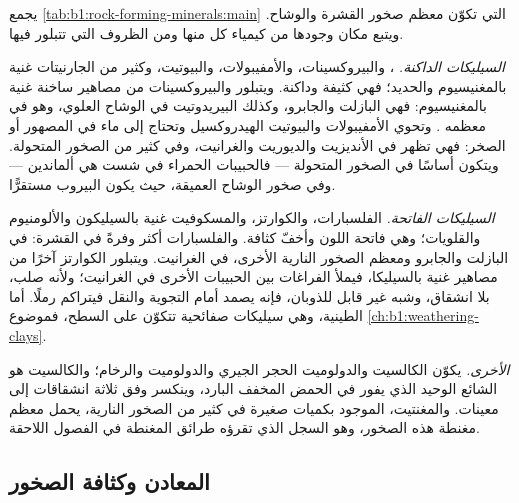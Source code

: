 يجمع \cref{tab:b1:rock-forming-minerals:main}  التي تكوّن معظم صخور القشرة والوشاح. ويتبع مكان وجودها من كيمياء كل منها ومن الظروف التي تتبلور فيها.

\emph{السيليكات الداكنة.} ، والبيروكسينات، والأمفيبولات، والبيوتيت، وكثير من الجارنيتات غنية بالمغنيسيوم والحديد؛ فهي كثيفة وداكنة. ويتبلور  والبيروكسينات من مصاهير ساخنة غنية بالمغنيسيوم: فهي  البازلت والجابرو، وكذلك البيريدوتيت في الوشاح العلوي، وهو في معظمه . وتحوي الأمفيبولات والبيوتيت الهيدروكسيل وتحتاج إلى ماء في المصهور أو الصخر: فهي تظهر في الأنديزيت والديوريت والغرانيت، وفي كثير من الصخور المتحولة. ويتكون  أساسًا في الصخور المتحولة --- فالحبيبات الحمراء في شست  هي ألماندين --- وفي صخور الوشاح العميقة، حيث يكون البيروب مستقرًّا.

\emph{السيليكات الفاتحة.} الفلسبارات، والكوارتز، والمسكوفيت غنية بالسيليكون والألومنيوم والقلويات؛ وهي فاتحة اللون وأخفّ كثافة. والفلسبارات أكثر  وفرةً في القشرة:  في البازلت والجابرو ومعظم الصخور النارية الأخرى،  في الغرانيت. ويتبلور الكوارتز آخرًا من مصاهير غنية بالسيليكا، فيملأ الفراغات بين الحبيبات الأخرى في الغرانيت؛ ولأنه صلب، بلا انشقاق، وشبه غير قابل للذوبان، فإنه يصمد أمام التجوية والنقل فيتراكم رملًا. أما  الطينية، وهي سيليكات صفائحية تتكوّن على السطح، فموضوع \cref{ch:b1:weathering-clays}.

\emph{الأخرى.} يكوّن الكالسيت والدولوميت الحجر الجيري والدولوميت والرخام؛ والكالسيت هو  الشائع الوحيد الذي يفور في الحمض المخفف البارد، وينكسر وفق ثلاثة انشقاقات إلى معينات. والمغنتيت، الموجود بكميات صغيرة في كثير من الصخور النارية، يحمل معظم مغنطة هذه الصخور، وهو السجل الذي تقرؤه طرائق المغنطة في الفصول اللاحقة.


\subsection{المعادن وكثافة الصخور}

